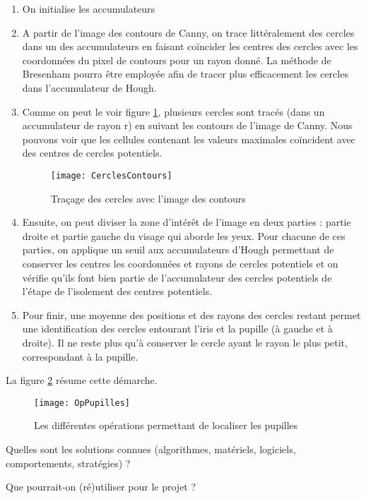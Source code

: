 \begin{enumerate}
\item On initialise les accumulateurs
\item A partir de l’image des contours de Canny, on trace littéralement des cercles dans un des accumulateurs en faisant coïncider les centres des cercles avec les coordonnées du pixel de contours pour un rayon donné. La méthode de Bresenham pourra être employée afin de tracer plus efficacement les cercles dans l’accumulateur de Hough.
\item Comme on peut le voir figure \ref{fig:CerclesContours}, plusieurs cercles sont tracés (dans un accumulateur de rayon r) en suivant les contours de l’image de Canny. Nous pouvons voir que les cellules contenant les valeurs maximales coïncident avec des centres de cercles potentiels.

\begin{figure}[H]
  \centering
  \texttt{[image: CerclesContours]}
  \caption{Traçage des cercles avec l’image des contours}
  \label{fig:CerclesContours}
\end{figure}

\item Ensuite, on peut diviser la zone d’intérêt de l’image en deux parties : partie droite et partie gauche du visage qui aborde les yeux. Pour chacune de ces parties, on applique un seuil aux accumulateurs d’Hough permettant de conserver les centres les coordonnées et rayons de cercles potentiels et on vérifie qu’ils font bien partie de l’accumulateur des cercles potentiels de l’étape de l’isolement des centres potentiels.
\item Pour finir, une moyenne des positions et des rayons des cercles restant permet une identification des cercles entourant l’iris et la pupille (à gauche et à droite). Il ne reste plus qu’à conserver le cercle ayant le rayon le plus petit, correspondant à la pupille.
\end{enumerate}

La figure \ref{fig:OpPupilles} résume cette démarche.

\begin{figure}[H]
  \centering
  \texttt{[image: OpPupilles]}
  \caption{Les différentes opérations permettant de localiser les pupilles}
  \label{fig:OpPupilles}
\end{figure}

Quelles sont les solutions connues (algorithmes, matériels, logiciels, comportements, stratégies) ? 

Que pourrait-on (ré)utiliser pour le projet ? 